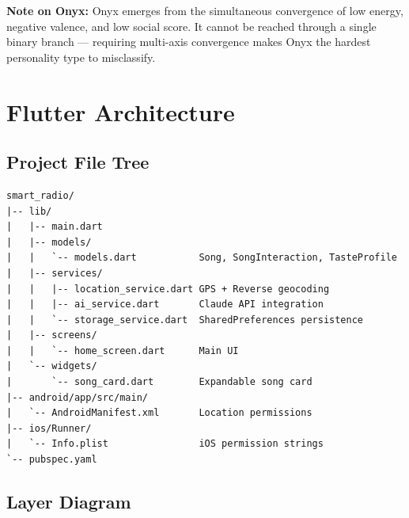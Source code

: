 \documentclass[12pt, a4paper]{report}
\begin{document}
\begin{tcolorbox}[notebox]
\textbf{\color{solarcolor}Note on Onyx:} Onyx emerges from the simultaneous
convergence of low energy, negative valence, and low social score.
It cannot be reached through a single binary branch --- requiring multi-axis
convergence makes Onyx the hardest personality type to misclassify.
\end{tcolorbox}

\chapter{Flutter Architecture}

\section{Project File Tree}

\begin{tcolorbox}[cyanbox, title=Directory Structure]
\begin{lstlisting}[style=bashcode, numbers=none]
smart_radio/
|-- lib/
|   |-- main.dart
|   |-- models/
|   |   `-- models.dart           Song, SongInteraction, TasteProfile
|   |-- services/
|   |   |-- location_service.dart GPS + Reverse geocoding
|   |   |-- ai_service.dart       Claude API integration
|   |   `-- storage_service.dart  SharedPreferences persistence
|   |-- screens/
|   |   `-- home_screen.dart      Main UI
|   `-- widgets/
|       `-- song_card.dart        Expandable song card
|-- android/app/src/main/
|   `-- AndroidManifest.xml       Location permissions
|-- ios/Runner/
|   `-- Info.plist                iOS permission strings
`-- pubspec.yaml
\end{lstlisting}
\end{tcolorbox}

\section{Layer Diagram}
\end{document}
